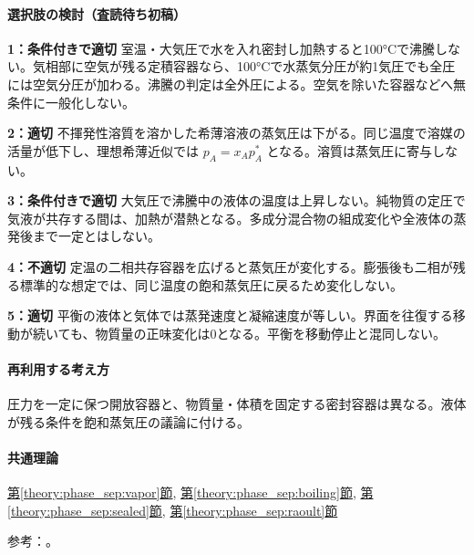 \paragraph{選択肢の検討（査読待ち初稿）}\mbox{}\par

\noindent\textbf{1：条件付きで適切} 室温・大気圧で水を入れ密封し加熱すると100°Cで沸騰しない。気相部に空気が残る定積容器なら、100°Cで水蒸気分圧が約1気圧でも全圧には空気分圧が加わる。沸騰の判定は全外圧による。空気を除いた容器などへ無条件に一般化しない。\par

\noindent\textbf{2：適切} 不揮発性溶質を溶かした希薄溶液の蒸気圧は下がる。同じ温度で溶媒の活量が低下し、理想希薄近似では \(p_A=x_Ap_A^*\) となる。溶質は蒸気圧に寄与しない。\par

\noindent\textbf{3：条件付きで適切} 大気圧で沸騰中の液体の温度は上昇しない。純物質の定圧で気液が共存する間は、加熱が潜熱となる。多成分混合物の組成変化や全液体の蒸発後まで一定とはしない。\par

\noindent\textbf{4：不適切} 定温の二相共存容器を広げると蒸気圧が変化する。膨張後も二相が残る標準的な想定では、同じ温度の飽和蒸気圧に戻るため変化しない。\par

\noindent\textbf{5：適切} 平衡の液体と気体では蒸発速度と凝縮速度が等しい。界面を往復する移動が続いても、物質量の正味変化は0となる。平衡を移動停止と混同しない。\par

\paragraph{再利用する考え方} 圧力を一定に保つ開放容器と、物質量・体積を固定する密封容器は異なる。液体が残る条件を飽和蒸気圧の議論に付ける。

\paragraph{共通理論} \hyperref[theory:phase_sep:vapor]{第\ref*{theory:phase_sep:vapor}節}, \hyperref[theory:phase_sep:boiling]{第\ref*{theory:phase_sep:boiling}節}, \hyperref[theory:phase_sep:sealed]{第\ref*{theory:phase_sep:sealed}節}, \hyperref[theory:phase_sep:raoult]{第\ref*{theory:phase_sep:raoult}節}

\par 参考：\cite{mit_solutions2008,mit_clapeyron2008}。

